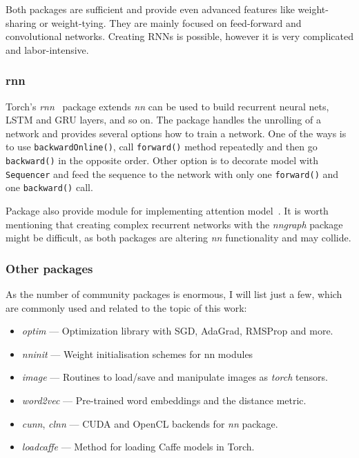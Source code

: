 Both packages are sufficient and provide even advanced features like weight-sharing or weight-tying. They are mainly focused on feed-forward and convolutional networks. Creating RNNs is possible, however it is very complicated and labor-intensive.

\subsubsection{rnn}\label{subsec:torch-rnn}

Torch's \emph{rnn}~\cite{DBLP:journals/corr/LeonardWW15} package extends \emph{nn} can be used to build recurrent neural nets, LSTM and GRU layers, and so on. The package handles the unrolling of a network and provides several options how to train a network. One of the ways is to use \texttt{backwardOnline()}, call \texttt{forward()} method repeatedly and then go \texttt{backward()} in the opposite order. Other option is to decorate model with \texttt{Sequencer} and feed the sequence to the network with only one \texttt{forward()} and one \texttt{backward()} call.

Package also provide module for implementing attention model~\cite{DBLP:journals/corr/MnihHGK14}. It is worth mentioning that creating complex recurrent networks with the \emph{nngraph} package might be difficult, as both packages are altering \emph{nn} functionality and may collide.

\subsubsection{Other packages}

As the number of community packages is enormous, I will list just a few, which are commonly used and related to the topic of this work:

\vspace{5mm}
\begin{minipage}{0.9\textwidth}
	\begin{itemize}
		\item \emph{optim} --- Optimization library with SGD, AdaGrad, RMSProp and more.
		\item \emph{nninit} --- Weight initialisation schemes for nn modules
		\item \emph{image} --- Routines to load/save and manipulate images as \emph{torch} tensors.
		\item \emph{word2vec} --- Pre-trained word embeddings and the distance metric.
		\item \emph{cunn}, \emph{clnn} --- CUDA and OpenCL backends for \emph{nn} package.
		\item \emph{loadcaffe} --- Method for loading Caffe models in Torch.
	\end{itemize}
\end{minipage}
\vspace{3mm}

